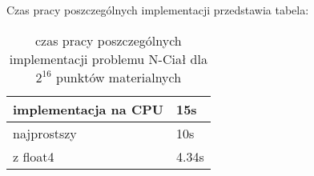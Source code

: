 
Czas pracy poszczególnych implementacji przedstawia tabela:
\begin{table}
\caption{ czas pracy poszczególnych implementacji problemu N-Ciał dla $2^{16}$ punktów materialnych }
\label{wyniki}

\begin{tabular}{ |p{\dimexpr 0.5\linewidth}|
                  p{\dimexpr 0.5\linewidth}| }
 \hline
 implementacja na CPU & 15s \\
 \hline
 najprostszy & 10s \\
 \hline
 z float4 & 4.34s \\
 \hline
\end{tabular}

\end{table}
 